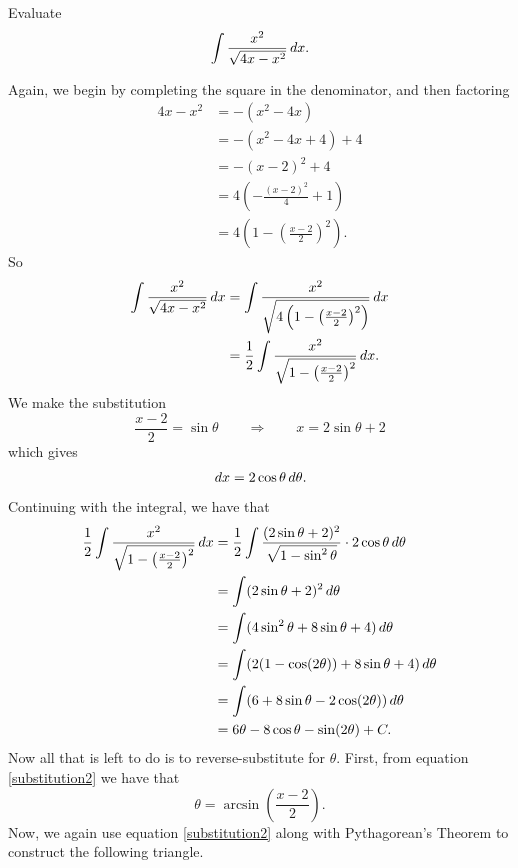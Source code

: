 \documentclass[]{ximera}
\begin{document}
\begin{problem}
Evaluate
	\[
	\int \frac{x^2}{\sqrt{4x-x^2}} \,d x.
	\]
	\begin{freeResponse}
	Again, we begin by completing the square in the denominator, and then factoring
		\begin{align*}
		4x-x^2 &= -(x^2-4x)  \\
		&= -(x^2-4x+4) + 4  \\
		&= -(x-2)^2 + 4  \\
		&= 4 \left( - \frac{(x-2)^2}{4} + 1 \right)  \\
		&= 4 \left( 1 - \left( \frac{x-2}{2} \right)^2 \right).
		\end{align*}
	So
		\begin{align*}
		\int \frac{x^2}{\sqrt{4x-x^2}} \,d x &= \int \frac{x^2}{\sqrt{4 \left( 1 - \left( \frac{x-2}{2} \right)^2 \right)}} \,d x  \\
		&= \frac{1}{2} \int \frac{x^2}{\sqrt{1 - \left( \frac{x-2}{2} \right)^2}} \,d x.
		\end{align*}
	We make the substitution
		\begin{equation}\label{substitution2}
		\frac{x-2}{2} = \sin \theta	\qquad	\Longrightarrow	\qquad	x = 2\sin \theta + 2
		\end{equation}
	which gives
		\[
		\,d x = 2 \cos \theta \,d \theta.
		\]
	Continuing with the integral, we have that
		\begin{align*}
		\frac{1}{2} \int \frac{x^2}{\sqrt{1 - \left( \frac{x-2}{2} \right)^2}} \,d x
		&= \frac{1}{2} \int \frac{(2 \sin \theta + 2)^2}{\sqrt{1 - \sin^2 \theta}} \cdot 2 \cos \theta \,d \theta  \\
		&= \int (2\sin \theta + 2)^2 \,d \theta  \\
		&= \int ( 4 \sin^2 \theta + 8 \sin \theta + 4) \,d \theta  \\
		&= \int (2(1-\cos(2\theta)) + 8\sin \theta + 4) \,d \theta  \\
		&= \int (6 + 8\sin \theta - 2\cos(2\theta)) \,d \theta  \\
		&= 6 \theta - 8 \cos \theta - \sin(2\theta) + C.
		\end{align*}
	Now all that is left to do is to reverse-substitute for $\theta$.  
	First, from equation \eqref{substitution2} we have that
		\[
		\theta = \arcsin \left( \frac{x-2}{2} \right).
		\]
	Now, we again use equation \eqref{substitution2} along with Pythagorean's Theorem to construct the following triangle.
	

\end{freeResponse}
\end{problem}
\end{document}
